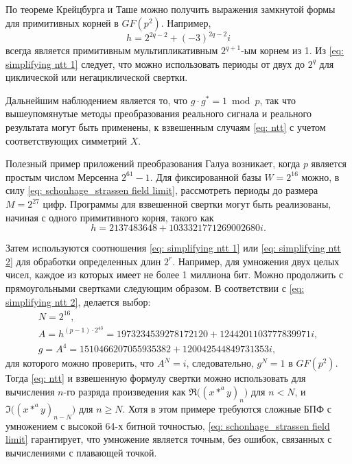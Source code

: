 По теореме Крейцбурга и Таше можно получить выражения замкнутой формы для примитивных корней в $GF(p^2)$.
Например,
$$
h = 2^{2 q - 2} + (-3)^{2 q - 2}i
$$
всегда является примитивным мультипликативным $2^{q + 1}$-ым корнем из 1.
Из \eqref{eq: simplifying ntt 1} следует, что можно использовать периоды от двух до $2^q$ для циклической или негациклической свертки.

Дальнейшим наблюдением является то, что $g \cdot g^*=1 \bmod{p}$, так что вышеупомянутые методы преобразования реального сигнала и реального результата могут быть применены, к взвешенным случаям \eqref{eq: ntt} с учетом соответствующих симметрий $X$.

Полезный пример приложений преобразования Галуа возникает, когда $p$ является простым числом Мерсенна $2^{61} - 1$.
Для фиксированной базы $W = 2^{16}$ можно, в силу \eqref{eq: schonhage_strassen field limit}, рассмотреть периоды до размера $M = 2^{27}$ цифр.
Программы для взвешенной свертки могут быть реализованы, начиная с одного примитивного корня, такого как
$$
h = 2137483648+1033321771269002680 i.
$$

Затем используются соотношения \eqref{eq: simplifying ntt 1} или \eqref{eq: simplifying ntt 2} для обработки определенных длин $2^r$.
Например, для умножения двух целых чисел, каждое из которых имеет не более 1 миллиона бит.
Можно продолжить с прямоугольными свертками следующим образом.
В соответствии с \eqref{eq: simplifying ntt 2}, делается выбор:
\begin{gather*}
N = 2^{16}, \\
A = h^{(p-1)\cdot 2^{43}} = 1973234539278172120+1244201103777839971 i, \\
g = A^4 = 1510466207055935382+120042544849731353i,
\end{gather*}
для которого можно проверить, что $A^N = i$, следовательно, $g^N = 1$ в $GF(p^2)$.
Тогда \eqref{eq: ntt} и взвешенную формулу свертки можно использовать для вычисления $n$-го разряда произведения как $\Re\big((x *^a y)_n\big)$ для $n < N$, и $\Im\big((x *^a y)_{n-N}\big)$ для $n \geq N$.
Хотя в этом примере требуются сложные БПФ с умножением с высокой 64-х битной точностью‚ \eqref{eq: schonhage_strassen field limit} гарантирует, что умножение является точным, без ошибок, связанных с вычислениями с плавающей точкой.
